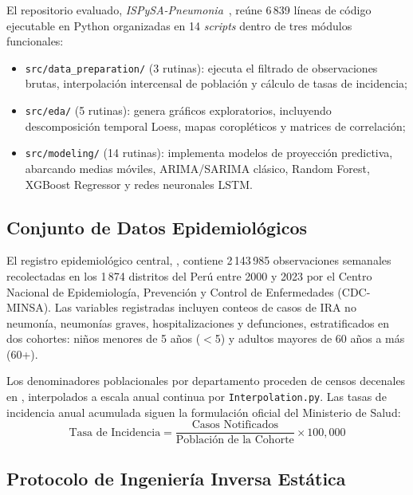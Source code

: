\documentclass[conference]{IEEEtran}
\begin{document}
El repositorio evaluado, \textit{ISPySA-Pneumonia}~\cite{Danala2024}, re\'une 6\,839 l\'ineas de c\'odigo ejecutable en Python organizadas en 14 \textit{scripts} dentro de tres m\'odulos funcionales:
\begin{itemize}
  \item \texttt{src/data\_preparation/} (3 rutinas): ejecuta el filtrado de observaciones brutas, interpolaci\'on intercensal de poblaci\'on y c\'alculo de tasas de incidencia;
  \item \texttt{src/eda/} (5 rutinas): genera gr\'aficos exploratorios, incluyendo descomposici\'on temporal Loess, mapas coropl\'eticos y matrices de correlaci\'on;
  \item \texttt{src/modeling/} (14 rutinas): implementa modelos de proyecci\'on predictiva, abarcando medias m\'oviles, ARIMA/SARIMA cl\'asico, Random Forest, XGBoost Regressor y redes neuronales LSTM.
\end{itemize}

\subsection{Conjunto de Datos Epidemiol\'ogicos}

El registro epidemiol\'ogico central, , contiene 2\,143\,985 observaciones semanales recolectadas en los 1\,874 distritos del Per\'u entre 2000 y 2023 por el Centro Nacional de Epidemiolog\'ia, Prevenci\'on y Control de Enfermedades (CDC-MINSA). Las variables registradas incluyen conteos de casos de IRA no neumon\'ia, neumon\'ias graves, hospitalizaciones y defunciones, estratificados en dos cohortes: ni\~nos menores de 5 a\~nos ($<$5) y adultos mayores de 60 a\~nos a m\'as (60+).

Los denominadores poblacionales por departamento proceden de censos decenales en , interpolados a escala anual continua por \texttt{Interpolation.py}. Las tasas de incidencia anual acumulada siguen la formulaci\'on oficial del Ministerio de Salud:
\begin{equation}
\text{Tasa de Incidencia} = \frac{\text{Casos Notificados}}{\text{Poblaci\'on de la Cohorte}} \times 100{,}000
\label{eq:incidence}
\end{equation}

\subsection{Protocolo de Ingenier\'ia Inversa Est\'atica}
\end{document}
